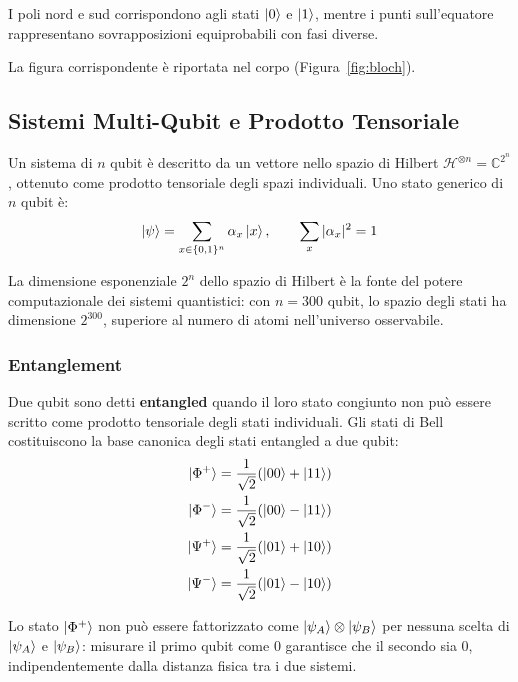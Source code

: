 \begin{onehalfspace}
I poli nord e sud corrispondono agli stati $\ket{0}$ e $\ket{1}$, mentre i punti sull'equatore rappresentano sovrapposizioni equiprobabili con fasi diverse.

La figura corrispondente è riportata nel corpo (Figura~\ref{fig:bloch}).

\subsection{Sistemi Multi-Qubit e Prodotto Tensoriale}

Un sistema di $n$ qubit è descritto da un vettore nello spazio di Hilbert $\mathcal{H}^{\otimes n} = \mathbb{C}^{2^n}$, ottenuto come prodotto tensoriale degli spazi individuali. Uno stato generico di $n$ qubit è:
\begin{equation}
    \ket{\psi} = \sum_{x \in \{0,1\}^n} \alpha_x \ket{x}, \qquad \sum_{x} |\alpha_x|^2 = 1
\end{equation}

La dimensione esponenziale $2^n$ dello spazio di Hilbert è la fonte del potere computazionale dei sistemi quantistici: con $n = 300$ qubit, lo spazio degli stati ha dimensione $2^{300}$, superiore al numero di atomi nell'universo osservabile.

\subsubsection{Entanglement}

Due qubit sono detti \textbf{entangled} quando il loro stato congiunto non può essere scritto come prodotto tensoriale degli stati individuali. Gli stati di Bell costituiscono la base canonica degli stati entangled a due qubit:
\begin{align}
    \ket{\Phi^+} &= \frac{1}{\sqrt{2}}(\ket{00} + \ket{11}) \\
    \ket{\Phi^-} &= \frac{1}{\sqrt{2}}(\ket{00} - \ket{11}) \\
    \ket{\Psi^+} &= \frac{1}{\sqrt{2}}(\ket{01} + \ket{10}) \\
    \ket{\Psi^-} &= \frac{1}{\sqrt{2}}(\ket{01} - \ket{10})
\end{align}

Lo stato $\ket{\Phi^+}$ non può essere fattorizzato come $\ket{\psi_A} \otimes \ket{\psi_B}$ per nessuna scelta di $\ket{\psi_A}$ e $\ket{\psi_B}$: misurare il primo qubit come $0$ garantisce che il secondo sia $0$, indipendentemente dalla distanza fisica tra i due sistemi.


\end{onehalfspace}

